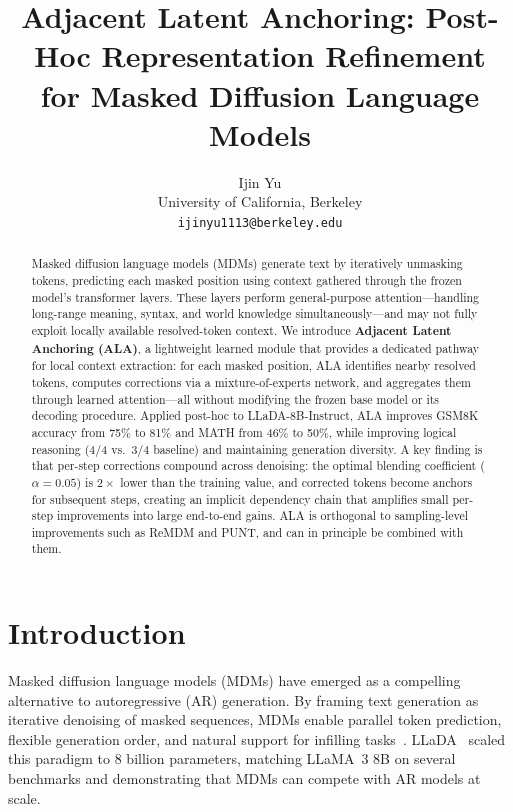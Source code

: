 \documentclass{article} %
\title{Adjacent Latent Anchoring: Post-Hoc Representation Refinement\\for Masked Diffusion Language Models}
\author{
Ijin Yu \\
University of California, Berkeley \\
\texttt{ijinyu1113@berkeley.edu}
}
\begin{document}
\ifcolmsubmission
\linenumbers
\fi

\maketitle

\begin{abstract}
Masked diffusion language models (MDMs) generate text by iteratively unmasking tokens, predicting each masked position using context gathered through the frozen model's transformer layers.
These layers perform general-purpose attention---handling long-range meaning, syntax, and world knowledge simultaneously---and may not fully exploit locally available resolved-token context.
We introduce \textbf{Adjacent Latent Anchoring (ALA)}, a lightweight learned module that provides a dedicated pathway for local context extraction: for each masked position, ALA identifies nearby resolved tokens, computes corrections via a mixture-of-experts network, and aggregates them through learned attention---all without modifying the frozen base model or its decoding procedure.
Applied post-hoc to LLaDA-8B-Instruct, ALA improves GSM8K accuracy from 75\% to 81\% and MATH from 46\% to 50\%, while improving logical reasoning (4/4 vs.\ 3/4 baseline) and maintaining generation diversity.
A key finding is that per-step corrections compound across denoising: the optimal blending coefficient ($\alpha{=}0.05$) is $2\times$ lower than the training value, and corrected tokens become anchors for subsequent steps, creating an implicit dependency chain that amplifies small per-step improvements into large end-to-end gains.
ALA is orthogonal to sampling-level improvements such as ReMDM and PUNT, and can in principle be combined with them.
\end{abstract}


\section{Introduction}
\label{sec:intro}

Masked diffusion language models (MDMs) have emerged as a compelling alternative to autoregressive (AR) generation.
By framing text generation as iterative denoising of masked sequences, MDMs enable parallel token prediction, flexible generation order, and natural support for infilling tasks~\citep{austin2021structured, sahoo2024simple, nie2025llada}.
LLaDA~\citep{nie2025llada} scaled this paradigm to 8 billion parameters, matching LLaMA~3 8B on several benchmarks and demonstrating that MDMs can compete with AR models at scale.
\end{document}
